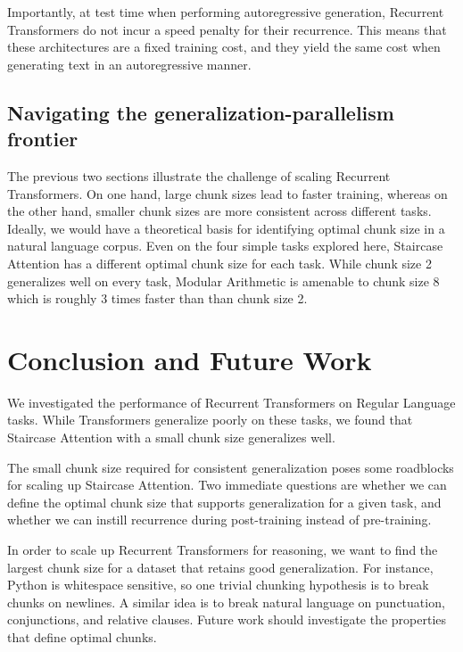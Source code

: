     Importantly, at test time when performing autoregressive generation, Recurrent Transformers do not incur a speed penalty for their recurrence. This means that these architectures are a fixed training cost, and they yield the same cost when generating text in an autoregressive manner.
    
    \subsection{Navigating the generalization-parallelism frontier}
    The previous two sections illustrate the challenge of scaling Recurrent Transformers. On one hand, large chunk sizes lead to faster training, whereas on the other hand, smaller chunk sizes are more consistent across different tasks. Ideally, we would have a theoretical basis for identifying optimal chunk size in a natural language corpus. Even on the four simple tasks explored here, Staircase Attention has a different optimal chunk size for each task. While chunk size 2 generalizes well on every task, Modular Arithmetic is amenable to chunk size 8 which is roughly 3 times faster than than chunk size 2.
    
    \section{Conclusion and Future Work}
    
    We investigated the performance of Recurrent Transformers on Regular Language tasks. While Transformers generalize poorly on these tasks, we found that Staircase Attention with a small chunk size generalizes well. 
    
    The small chunk size required for consistent generalization poses some roadblocks for scaling up Staircase Attention. Two immediate questions are whether we can define the optimal chunk size that supports generalization for a given task, and whether we can instill recurrence during post-training instead of pre-training.
    
    In order to scale up Recurrent Transformers for reasoning, we want to find the largest chunk size for a dataset that retains good generalization. For instance, Python is whitespace sensitive, so one trivial chunking hypothesis is to break chunks on newlines. A similar idea is to break natural language on punctuation, conjunctions, and relative clauses. Future work should investigate the properties that define optimal chunks.
    
